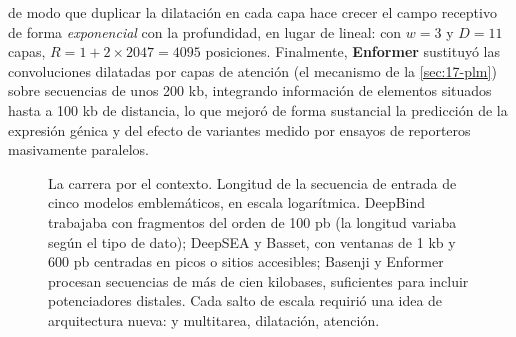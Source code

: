 \begin{simbolos}
\end{simbolos}

\noindent de modo que duplicar la dilatación en cada capa hace crecer el campo receptivo de forma \emph{exponencial} con la profundidad, en lugar de lineal: con $w=3$ y $D=11$ capas, $R=1+2\times2047=\num{4095}$ posiciones. Finalmente, \textbf{Enformer} \parencite{c17-avsec2021} sustituyó las convoluciones dilatadas por capas de atención (el mecanismo de la \cref{sec:17-plm}) sobre secuencias de unos \num{200} kb, integrando información de elementos situados hasta a 100 kb de distancia, lo que mejoró de forma sustancial la predicción de la expresión génica y del efecto de variantes medido por ensayos de reporteros masivamente paralelos.

\begin{figure}[!tbp]
\centering
{}
\caption[El contexto de secuencia de los modelos genómicos]{La carrera por el contexto. Longitud de la secuencia de entrada de cinco modelos emblemáticos, en escala logarítmica. DeepBind trabajaba con fragmentos del orden de 100 pb (la longitud variaba según el tipo de dato); DeepSEA y Basset, con ventanas de 1 kb y 600 pb centradas en picos o sitios accesibles; Basenji y Enformer procesan secuencias de más de cien kilobases, suficientes para incluir potenciadores distales. Cada salto de escala requirió una idea de arquitectura nueva:  y multitarea, dilatación, atención.}
\label{fig:17-contexto}
\end{figure}

